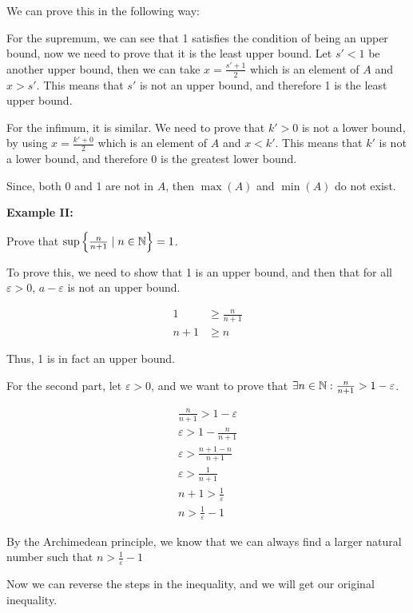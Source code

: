 We can prove this in the following way:

For the supremum, we can see that 1 satisfies the condition of being an upper bound, now we need to
prove that it is the least upper bound. Let \(s' < 1\) be another upper bound, then we can take \(x = \frac{s' + 1}{2}\) which is
an element of \(A\) and \(x > s'\). This means that \(s'\) is not an upper bound, and therefore 1 is the least upper bound.

For the infimum, it is similar. We need to prove that \(k' > 0\) is not a lower bound, by using \(x = \frac{k' + 0}{2}\) which is an element of \(A\) and \(x < k'\).
This means that \(k'\) is not a lower bound, and therefore 0 is the greatest lower bound.

Since, both 0 and 1 are not in \(A\), then \(\max(A)\) and \(\min(A)\) do not exist.

\QED

\textbf{Example II:}

Prove that \(\sup \left\{\frac{n}{n + 1} \mid n \in \mathbb{N}\right\} = 1\).

To prove this, we need to show that 1 is an upper bound, and then that for all \(\varepsilon > 0\), \(a - \varepsilon\) is not
an upper bound.

\begin{align*}
	1     & \ge \frac{n}{n + 1} \\
	n + 1 & \ge n
\end{align*}

Thus, 1 is in fact an upper bound.

For the second part, let \(\varepsilon > 0\), and we want to prove that \(\exists n \in \mathbb{N} : \frac{n}{n + 1} > 1 - \varepsilon\).

\begin{align*}
	\frac{n}{n + 1} > 1 - \varepsilon      \\
	\varepsilon >  1 - \frac{n}{n + 1}     \\
	\varepsilon >  \frac{n + 1 - n}{n + 1} \\
	\varepsilon >  \frac{1}{n + 1}         \\
	n + 1 >  \frac{1}{\varepsilon}         \\
	n  >  \frac{1}{\varepsilon}  - 1
\end{align*}

By the Archimedean principle, we know that we can always find a larger natural number such that \(n > \frac{1}{\varepsilon} - 1\)

Now we can reverse the steps in the inequality, and we will get our original inequality.

